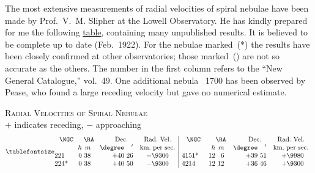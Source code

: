 \documentclass[12pt]{book}
\begin{document}
The most extensive measurements of radial velocities of spiral nebulae
%
%
have been made by Prof.\ V.~M. Slipher at the Lowell Observatory. He has
kindly prepared for me the following \hyperref[table:70.1]{table}, containing many unpublished
results. It is believed to be complete up to date (Feb.~1922). For the nebulae
marked~(*) the results have been closely confirmed at other observatories;
those marked~(\dag) are not so accurate as the others. The number in the first
column refers to the ``New General Catalogue,''  vol.~49. One
additional nebula \NGC\ 1700 has been observed by Pease, who found a large
receding velocity but gave no numerical estimate.
\begin{table}[hb]
  \centering
\textsc{Radial Velocities of Spiral Nebulae} \\
$+$ indicates receding, $-$ approaching
\label{table:70.1}%
\[
\tablefontsize
\begin{array}{@{}r@{\qquad}r@{\ }r@{\quad\ }r@{\ }rc|r@{\qquad}r@{\ }r@{\quad\ }r@{\ }rc@{}}
  \multicolumn{1}{c}{\text{\NGC}} & \multicolumn{2}{c}{\RA} & \multicolumn{2}{c}{\text{\quad Dec.}} & \multicolumn{1}{c|}{\text{Rad.\ Vel.}} &
  \multicolumn{1}{c}{\text{\NGC}} & \multicolumn{2}{c}{\RA} & \multicolumn{2}{c}{\text{\quad Dec.}} & \multicolumn{1}{c}{\text{Rad.\ Vel.}} \\
  & h & m & \degree & ' & \multicolumn{1}{c|}{\text{km.\ per sec.}} &
  & h & m & \degree & ' & \multicolumn{1}{c}{\text{km.\ per sec.}} \\
  221 & 0 & 38 & +40 & 26 & -\9 300 & 4151\rlap{*} & 12 & 6 & +39 & 51 & +\9 980 \\
  224\rlap{*} & 0 & 38 & +40 & 50 & -\9 300 & 4214 & 12 & 12 & +36 & 46 & +\9 300 \\


\end{array}\]
\end{table}
\end{document}

